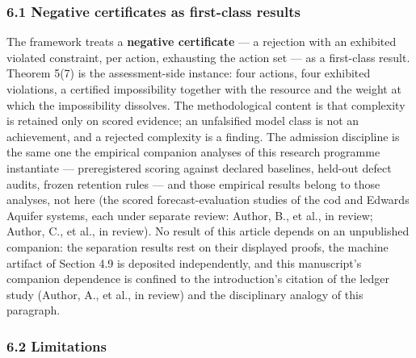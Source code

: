 \documentclass[11pt]{article}
\begin{document}
\subsubsection{6.1 Negative certificates as first-class
results}\label{negative-certificates-as-first-class-results}

The framework treats a \textbf{negative certificate} --- a rejection
with an exhibited violated constraint, per action, exhausting the action
set --- as a first-class result. Theorem 5(7) is the assessment-side
instance: four actions, four exhibited violations, a certified
impossibility together with the resource and the weight at which the
impossibility dissolves. The methodological content is that complexity
is retained only on scored evidence; an unfalsified model class is not
an achievement, and a rejected complexity is a finding. The admission
discipline is the same one the empirical companion analyses of this
research programme instantiate --- preregistered scoring against
declared baselines, held-out defect audits, frozen retention rules ---
and those empirical results belong to those analyses, not here (the
scored forecast-evaluation studies of the cod and Edwards Aquifer
systems, each under separate review: Author, B., et al., in review;
Author, C., et al., in review). No result of this article depends on an
unpublished companion: the separation results rest on their displayed
proofs, the machine artifact of Section 4.9 is deposited independently,
and this manuscript's companion dependence is confined to the
introduction's citation of the ledger study (Author, A., et al., in
review) and the disciplinary analogy of this paragraph.

\subsubsection{6.2 Limitations}\label{limitations}
\end{document}
